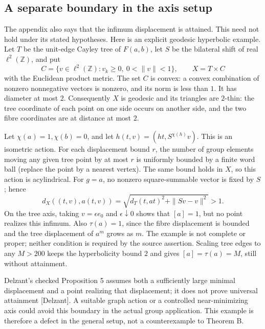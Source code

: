 \documentclass[10pt]{article}
\begin{document}
\subsection*{A separate boundary in the axis setup}
The appendix also says that the infimum displacement is attained. This need not hold under its stated hypotheses. Here is an explicit geodesic hyperbolic example. Let \(T\) be the unit-edge Cayley tree of \(F(a,b)\), let \(S\) be the bilateral shift of real \(\ell^2(\mathbb Z)\), and put \[C=\{v\in\ell^2(\mathbb Z):v_k\ge0,\ 0<\|v\|<1\},\qquad
 X=T\times C\] with the Euclidean product metric. The set \(C\) is convex: a convex combination of nonzero nonnegative vectors is nonzero, and its norm is less than \(1\). It has diameter at most \(2\). Consequently \(X\) is geodesic and its triangles are \(2\)-thin: the tree coordinate of each point on one side occurs on another side, and the two fibre coordinates are at distance at most \(2\).\par
Let \(\chi(a)=1,\chi(b)=0\), and let \(h(t,v)=(ht,S^{\chi(h)}v)\). This is an isometric action. For each displacement bound \(r\), the number of group elements moving any given tree point by at most \(r\) is uniformly bounded by a finite word ball (replace the point by a nearest vertex). The same bound holds in \(X\), so this action is acylindrical. For \(g=a\), no nonzero square-summable vector is fixed by \(S\); hence \[d_X((t,v),a(t,v))
 =\sqrt{d_T(t,at)^2+\|Sv-v\|^2}>1.\] On the tree axis, taking \(v=\epsilon e_0\) and \(\epsilon\downarrow0\) shows that \([a]=1\), but no point realizes this infimum. Also \(\tau(a)=1\), since the fibre displacement is bounded and the tree displacement of \(a^m\) grows as \(m\). The example is not complete or proper; neither condition is required by the source assertion. Scaling tree edges to any \(M>200\) keeps the hyperbolicity bound \(2\) and gives \([a]=\tau(a)=M\), still without attainment.\par
Delzant’s checked Proposition 5 assumes both a sufficiently large minimal displacement and a point realizing that displacement; it does not prove universal attainment [Delzant]. A suitable graph action or a controlled near-minimizing axis could avoid this boundary in the actual group application. This example is therefore a defect in the general setup, not a counterexample to Theorem B.\par
\end{document}

